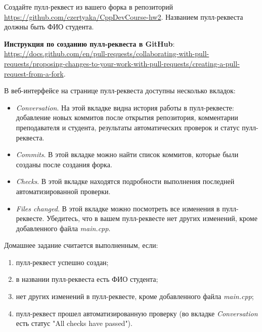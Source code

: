 \documentclass[14pt]{extarticle}
\begin{document}
    Создайте пулл-реквест из вашего форка в репозиторий
    \url{https://github.com/czertyaka/CppDevCourse-hw2}.
    Названием пулл-реквеста должны быть ФИО студента.

    \begin{tcolorbox}
        \textbf{Инструкция по созданию пулл-реквеста в GitHub}: \\
        \url{https://docs.github.com/en/pull-requests/collaborating-with-pull-requests/proposing-changes-to-your-work-with-pull-requests/creating-a-pull-request-from-a-fork}.
    \end{tcolorbox}

    В веб-интерфейсе на странице пулл-реквеста доступны несколько вкладок:

    \begin{itemize}

        \item \textit{Conversation}. На этой вкладке видна история работы в пулл-реквесте:
            добавление новых коммитов после открытия репозитория, комментарии
            преподавателя и студента, результаты автоматических проверок и статус
            пулл-реквеста.

        \item \textit{Commits}. В этой вкладке можно найти список коммитов, которые
            были созданы после создания форка.

        \item \textit{Checks}. В этой вкладке находятся подробности выполнения
            последней автоматизированной проверки.

        \item \textit{Files changed}. В этой вкладке можно посмотреть все изменения
            в пулл-реквесте.
            Убедитесь, что в вашем пулл-реквесте нет других изменений, кроме
            добавленного файла \textit{main.cpp}.

    \end{itemize}

    Домашнее задание считается выполненным, если:

    \begin{enumerate}

        \item пулл-реквест успешно создан;

        \item в названии пулл-реквеста есть ФИО студента;

        \item нет других изменений в пулл-реквесте, кроме добавленного файла
            \textit{main.cpp};

        \item пулл-реквест прошел автоматизированную проверку (во вкладке
            \textit{Conversation} есть статус "All checks have passed").

    \end{enumerate}
\end{document}
